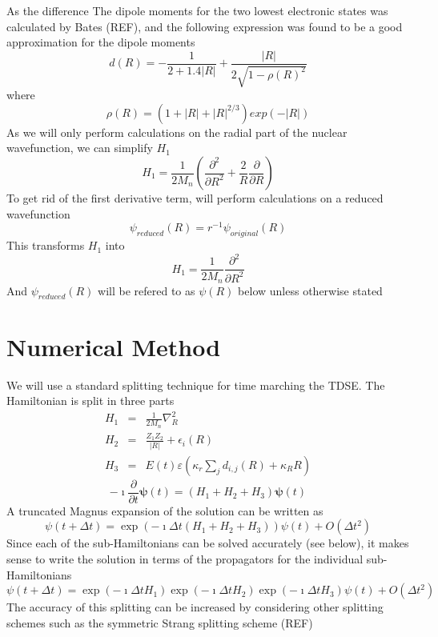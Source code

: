 \documentclass[a4paper]{article}
\begin{document}
As the difference The dipole moments for the two lowest electronic states was calculated by Bates (REF), and the following expression was found to be a good approximation for the dipole moments
\begin{equation}
	d(R) = -\frac{1}{2 + 1.4 |R|} + \frac{|R|}{2 \sqrt{1 - \rho(R)^2}}
\end{equation}
where 
\begin{equation}
	\rho(R) = (1 + |R| + |R|^{2/3}) exp(-|R|) 
\end{equation}
As we will only perform calculations on the radial part of the nuclear wavefunction, we can simplify $H_1$
\begin{equation}
	H_1 = \frac{1}{2 M_n} \left( \frac{\partial^2}{\partial R^2} + \frac{2}{R} \frac{\partial}{\partial R} \right)
\end{equation}
To get rid of the first derivative term, will perform calculations on a reduced wavefunction
\begin{equation}
	\psi_{reduced}(R) = r^{-1} \psi_{original}(R)
\end{equation}
This transforms $H_1$ into
\begin{equation}
	H_1 = \frac{1}{2 M_n} \frac{\partial^2}{\partial R^2} 
\end{equation}
And $\psi_{reduced}(R)$ will be refered to as $\psi(R)$ below unless otherwise stated

\section{Numerical Method}
We will use a standard splitting technique for time marching the TDSE. The Hamiltonian is split in three parts
\begin{eqnarray}
	H_1 &=& \frac{1}{2 M_n} \nabla^2_R \\
	H_2 &=& \frac{Z_1 Z_2}{|R|} + \epsilon_i(R) \\
	H_3 &=& E(t) \varepsilon \left( \kappa_r \sum_j d_{i, j}(R) + \kappa_R R \right)
\end{eqnarray}
\begin{equation}
	- \imath \frac{\partial}{\partial t} \mathbf{\psi}(t) = (H_1 + H_2 + H_3) \mathbf{\psi}(t)
\end{equation}
A truncated Magnus expansion of the solution can be written as
\begin{equation}
 	\psi(t + \Delta t) = \exp( - \imath \Delta t (H_1 + H_2 + H_3) ) \psi(t) + O(\Delta t^2)
\end{equation}
Since each of the sub-Hamiltonians can be solved accurately (see below), it makes sense to write the solution in terms of the propagators for the individual sub-Hamiltonians
\begin{equation}
	\psi(t + \Delta t) = \exp(- \imath \Delta t H_1) \exp(- \imath \Delta t H_2) \exp(- \imath \Delta t H_3) \psi(t) + O(\Delta t^2)
\end{equation}
The accuracy of this splitting can be increased by considering other splitting schemes such as the symmetric Strang splitting scheme (REF)
\end{document}
